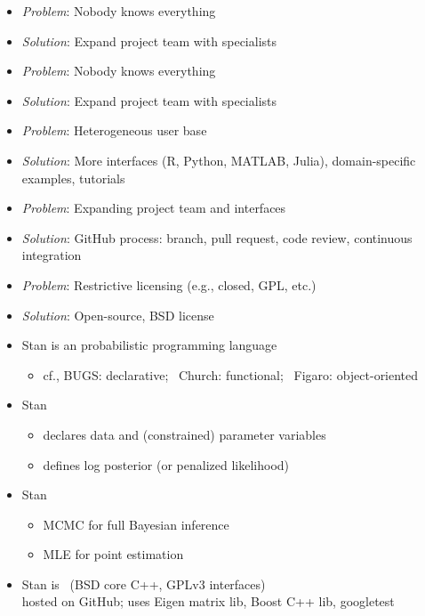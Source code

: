 \documentclass[10pt]{report}
\newcommand{\sld}[1]{\newpage{\noindent\LARGE \ \ \
    \textcolor{MidnightBlue}{\bfseries #1}}\vspace*{4pt}}
\newcommand{\myemph}[1]{{\color{MidnightBlue}{\bfseries #1}}}
\begin{document}
\sld{Why? (continued)}
\begin{itemize}
\item {\slshape Problem}:  Nobody knows everything
\item {\slshape Solution}: Expand project team with specialists
\vspace*{8pt}
\item {\slshape Problem}:  Nobody knows everything
\item {\slshape Solution}: Expand project team with specialists
\vspace*{8pt}
\item {\slshape Problem}:  Heterogeneous user base
\item {\slshape Solution}: More interfaces (R, Python, MATLAB, Julia),
  domain-specific examples, tutorials

\end{itemize}

\sld{Why? (continued)}
\begin{itemize}
\item {\slshape Problem}:  Expanding project team and interfaces
\item {\slshape Solution}: GitHub process: branch, pull request, code
  review, continuous integration
%
\vspace*{8pt}
\item {\slshape Problem}:  Restrictive licensing (e.g., closed, GPL, etc.)
\item {\slshape Solution}: Open-source, BSD license
\end{itemize}

\sld{What is Stan?}

\begin{itemize}
\item Stan is an \myemph{imperative} probabilistic programming language
  \vspace*{-12pt}
  \begin{itemize}\footnotesize
  \item  cf., BUGS: declarative; \ Church: functional; \ Figaro: object-oriented
  \end{itemize}
\item Stan \myemph{program}
  \vspace*{-4pt}
  \begin{itemize}\small
  \item declares data and (constrained) parameter variables
  \item defines log posterior (or penalized likelihood)
  \end{itemize}
\item Stan \myemph{inference}
  \vspace*{-4pt}
  \begin{itemize}\small
  \item MCMC for full Bayesian inference
  \item MLE for point estimation
  \end{itemize}
\item Stan is \myemph{open source} \ {\footnotesize (BSD core C++, GPLv3 interfaces)}
  \\
  {\footnotesize hosted on GitHub; uses Eigen matrix lib, Boost C++ lib, googletest}
\end{itemize}
\end{document}
